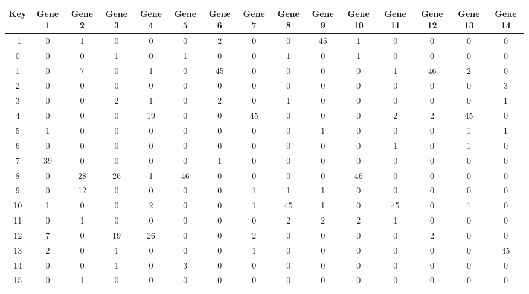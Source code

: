 \begin{tabular}{|c|c|c|c|c|c|c|c|c|c|c|c|c|c|c|}
\hline
Key & Gene 1 & Gene 2 & Gene 3 & Gene 4 & Gene 5 & Gene 6 & Gene 7 & Gene 8 & Gene 9 & Gene 10 & Gene 11 & Gene 12 & Gene 13 & Gene 14 \\
\hline
-1 & 0 & 1 & 0 & 0 & 0 & 2 & 0 & 0 & 45 & 1 & 0 & 0 & 0 & 0 \\
0 & 0 & 0 & 1 & 0 & 1 & 0 & 0 & 1 & 0 & 1 & 0 & 0 & 0 & 0 \\
1 & 0 & 7 & 0 & 1 & 0 & 45 & 0 & 0 & 0 & 0 & 1 & 46 & 2 & 0 \\
2 & 0 & 0 & 0 & 0 & 0 & 0 & 0 & 0 & 0 & 0 & 0 & 0 & 0 & 3 \\
3 & 0 & 0 & 2 & 1 & 0 & 2 & 0 & 1 & 0 & 0 & 0 & 0 & 0 & 1 \\
4 & 0 & 0 & 0 & 19 & 0 & 0 & 45 & 0 & 0 & 0 & 2 & 2 & 45 & 0 \\
5 & 1 & 0 & 0 & 0 & 0 & 0 & 0 & 0 & 1 & 0 & 0 & 0 & 1 & 1 \\
6 & 0 & 0 & 0 & 0 & 0 & 0 & 0 & 0 & 0 & 0 & 1 & 0 & 1 & 0 \\
7 & 39 & 0 & 0 & 0 & 0 & 1 & 0 & 0 & 0 & 0 & 0 & 0 & 0 & 0 \\
8 & 0 & 28 & 26 & 1 & 46 & 0 & 0 & 0 & 0 & 46 & 0 & 0 & 0 & 0 \\
9 & 0 & 12 & 0 & 0 & 0 & 0 & 1 & 1 & 1 & 0 & 0 & 0 & 0 & 0 \\
10 & 1 & 0 & 0 & 2 & 0 & 0 & 1 & 45 & 1 & 0 & 45 & 0 & 1 & 0 \\
11 & 0 & 1 & 0 & 0 & 0 & 0 & 0 & 2 & 2 & 2 & 1 & 0 & 0 & 0 \\
12 & 7 & 0 & 19 & 26 & 0 & 0 & 2 & 0 & 0 & 0 & 0 & 2 & 0 & 0 \\
13 & 2 & 0 & 1 & 0 & 0 & 0 & 1 & 0 & 0 & 0 & 0 & 0 & 0 & 45 \\
14 & 0 & 0 & 1 & 0 & 3 & 0 & 0 & 0 & 0 & 0 & 0 & 0 & 0 & 0 \\
15 & 0 & 1 & 0 & 0 & 0 & 0 & 0 & 0 & 0 & 0 & 0 & 0 & 0 & 0 \\
\hline
\end{tabular}